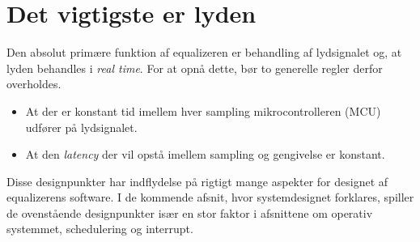 \section{Det vigtigste er lyden}
Den absolut primære funktion af equalizeren er behandling af lydsignalet og, at lyden behandles i \textit{real time}.
For at opnå dette, bør to generelle regler derfor overholdes.
\begin{itemize}[noitemsep]
\item At der er konstant tid imellem hver sampling mikrocontrolleren (MCU) udfører på lydsignalet.
\item At den \textit{latency} der vil opstå imellem sampling og gengivelse er konstant.
\end{itemize}

Disse designpunkter har indflydelse på rigtigt mange aspekter for designet af equalizerens software.
I de kommende afsnit, hvor systemdesignet forklares, spiller de ovenstående designpunkter især en stor faktor i afsnittene om operativ systemmet, schedulering og interrupt.
